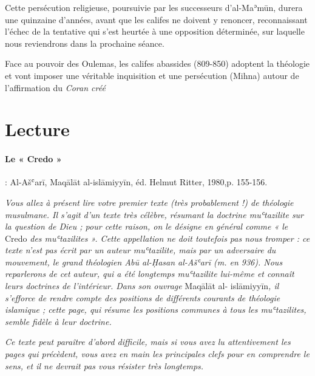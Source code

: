 Cette persécution religieuse, poursuivie par les successeurs
d'al-Maʾmūn, durera une quinzaine d'années, avant que les califes ne
doivent y renoncer, reconnaissant l'échec de la tentative qui s'est
heurtée à une opposition déterminée, sur laquelle nous reviendrons dans
la prochaine séance.

\begin{Synthesis}
Face au pouvoir des Oulemas, les califes abassides (809-850) adoptent la théologie \mzt et vont imposer une véritable inquisition et une persécution (Mihna) autour de l'affirmation du \textit{Coran créé}
\end{Synthesis}

\section{Lecture}
\paragraph{Le « Credo » \mzt} : Al-Ašʿarī, Maqālāt al-islāmiyyīn, éd.
Helmut Ritter, 1980,p. 155-156.
 
\emph{Vous allez à présent lire votre premier texte (très probablement
!) de théologie musulmane. Il s'agit d'un texte très célèbre, résumant
la doctrine muʿtazilite sur la question de Dieu ; pour cette raison, on
le désigne en général comme « le} Credo \emph{des muʿtazilites ». Cette
appellation ne doit toutefois pas nous tromper : ce texte n'est pas
écrit par un auteur muʿtazilite, mais par un adversaire du mouvement, le
grand théologien Abū al-Ḥasan al-Ašʿarī (m. en 936). Nous reparlerons de
cet auteur, qui a été longtemps muʿtazilite lui-même et connaît leurs
doctrines de l'intérieur. Dans son ouvrage} Maqālāt al-
islāmiyyīn\emph{, il s'efforce de rendre compte des positions de
différents courants de théologie islamique ; cette page, qui résume les
positions communes à tous les muʿtazilites, semble fidèle à leur
doctrine.}

\emph{Ce texte peut paraître d'abord difficile, mais si vous avez lu
attentivement les pages qui précèdent, vous avez en main les principales
clefs pour en comprendre le sens, et il ne devrait pas vous résister
très longtemps.}


